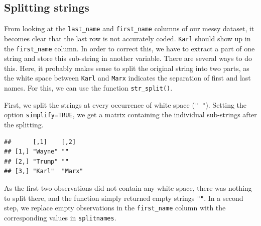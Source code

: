 \documentclass[
  12pt,
]{style/krantz}
\newenvironment{Shaded}{\begin{snugshade}}{\end{snugshade}}
\newcommand{\AttributeTok}[1]{\textcolor[rgb]{0.77,0.63,0.00}{#1}}
\newcommand{\ConstantTok}[1]{\textcolor[rgb]{0.00,0.00,0.00}{#1}}
\newcommand{\DecValTok}[1]{\textcolor[rgb]{0.00,0.00,0.81}{#1}}
\newcommand{\FunctionTok}[1]{\textcolor[rgb]{0.00,0.00,0.00}{#1}}
\newcommand{\NormalTok}[1]{#1}
\newcommand{\OtherTok}[1]{\textcolor[rgb]{0.56,0.35,0.01}{#1}}
\newcommand{\SpecialCharTok}[1]{\textcolor[rgb]{0.00,0.00,0.00}{#1}}
\newcommand{\StringTok}[1]{\textcolor[rgb]{0.31,0.60,0.02}{#1}}
\begin{document}
\hypertarget{splitting-strings}{%
\subsection{Splitting strings}\label{splitting-strings}}

From looking at the \texttt{last\_name} and \texttt{first\_name} columns of our messy dataset, it becomes clear that the last row is not accurately coded. \texttt{Karl} should show up in the \texttt{first\_name} column. In order to correct this, we have to extract a part of one string and store this sub-string in another variable. There are several ways to do this. Here, it probably makes sense to split the original string into two parts, as the white space between \texttt{Karl} and \texttt{Marx} indicates the separation of first and last names. For this, we can use the function \texttt{str\_split()}.

First, we split the strings at every occurrence of white space (\texttt{"\ "}). Setting the option \texttt{simplify=TRUE}, we get a matrix containing the individual sub-strings after the splitting.

\begin{Shaded}
\end{Shaded}

\begin{verbatim}
##      [,1]    [,2]  
## [1,] "Wayne" ""    
## [2,] "Trump" ""    
## [3,] "Karl"  "Marx"
\end{verbatim}

As the first two observations did not contain any white space, there was nothing to split there, and the function simply returned empty strings \texttt{""}. In a second step, we replace empty observations in the \texttt{first\_name} column with the corresponding values in \texttt{splitnames}.

\begin{Shaded}
\end{Shaded}
\end{document}
